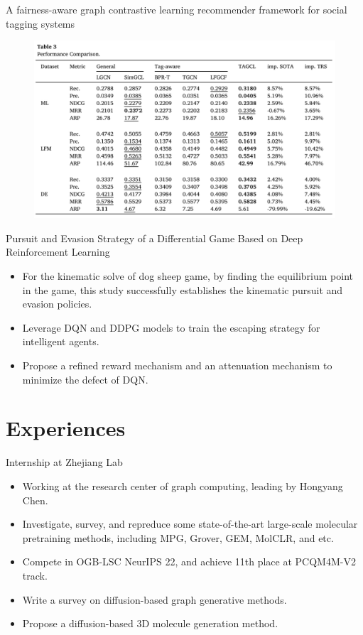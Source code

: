 \documentclass{beamer}
\begin{document}
\begin{frame}{A fairness-aware graph contrastive learning recommender framework for social tagging systems}
    \begin{figure}[H]
        \centering
        \includegraphics[width=\linewidth]{figure/tagcl_performance.png}
    \end{figure}
\end{frame}

\begin{frame}{Pursuit and Evasion Strategy of a Differential Game Based on Deep Reinforcement Learning}
    \begin{itemize}
        \item For the kinematic solve of dog sheep game, by finding the equilibrium point in the game, this study successfully establishes the kinematic pursuit and evasion policies.
        \item Leverage DQN and DDPG models to train the escaping strategy for intelligent agents.
        \item Propose a refined reward mechanism and an attenuation mechanism to minimize the defect of DQN.
    \end{itemize}
\end{frame}


\section{Experiences}
\begin{frame}{Internship at Zhejiang Lab}
    \begin{itemize}
        \item Working at the research center of graph computing, leading by Hongyang Chen.
        \item Investigate, survey, and repreduce some state-of-the-art large-scale molecular pretraining methods, including MPG, Grover, GEM, MolCLR, and etc.
        \item Compete in OGB-LSC NeurIPS 22, and achieve 11th place at PCQM4M-V2 track.
        \item Write a survey on diffusion-based graph generative methods.
        \item Propose a diffusion-based 3D molecule generation method.
    \end{itemize}
\end{frame}
\end{document}
